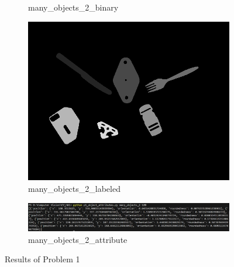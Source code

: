 \documentclass[bwprint]{gmcmthesis}
\numberwithin{figure}{section}
\begin{document}
\begin{enumerate}[label=\alph*.]
\begin{figure}[h]
\begin{subfigure}[b]{0.3\textwidth}
            \caption{many\_objects\_2\_binary}
            \label{fig:subfigure6}
        \end{subfigure}
        \hfill
        \begin{subfigure}[b]{0.3\textwidth}
            \centering
            \includegraphics[width=\textwidth]{../output/many_objects_2_labeled.png}
            \caption{many\_objects\_2\_labeled}
            \label{fig:subfigure7}
        \end{subfigure}
        \newline

        \begin{subfigure}[b]{\textwidth}
            \centering
            \includegraphics[width=\textwidth]{../output/many_objects_2_attribute.png}
            \caption{many\_objects\_2\_attribute}
            \label{fig:subfigure8}
        \end{subfigure}
    \caption{Results of Problem 1}
    \end{figure}
\end{enumerate}
\end{document}
